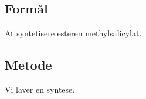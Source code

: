 \subsection*{Formål}
At syntetisere esteren methylsalicylat.

\subsection*{Metode}
Vi laver en syntese.
